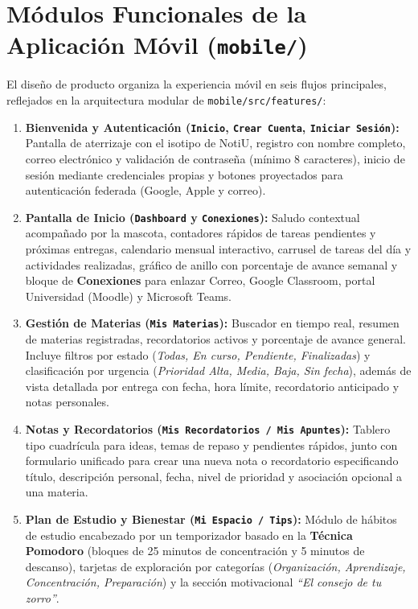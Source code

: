 \documentclass[11pt,letterpaper]{article}
\begin{document}
\section{Módulos Funcionales de la Aplicación Móvil (\texttt{mobile/})}

El diseño de producto organiza la experiencia móvil en seis flujos principales, reflejados en la arquitectura modular de \texttt{mobile/src/features/}:

\begin{enumerate}[leftmargin=1.5em, itemsep=4pt]
  \item \textbf{Bienvenida y Autenticación (\texttt{Inicio}, \texttt{Crear Cuenta}, \texttt{Iniciar Sesión}):}
  Pantalla de aterrizaje con el isotipo de NotiU, registro con nombre completo, correo electrónico y validación de contraseña (mínimo 8 caracteres), inicio de sesión mediante credenciales propias y botones proyectados para autenticación federada (Google, Apple y correo).

  \item \textbf{Pantalla de Inicio (\texttt{Dashboard} y \texttt{Conexiones}):}
  Saludo contextual acompañado por la mascota, contadores rápidos de tareas pendientes y próximas entregas, calendario mensual interactivo, carrusel de tareas del día y actividades realizadas, gráfico de anillo con porcentaje de avance semanal y bloque de \textbf{Conexiones} para enlazar Correo, Google Classroom, portal Universidad (Moodle) y Microsoft Teams.

  \item \textbf{Gestión de Materias (\texttt{Mis Materias}):}
  Buscador en tiempo real, resumen de materias registradas, recordatorios activos y porcentaje de avance general. Incluye filtros por estado (\emph{Todas, En curso, Pendiente, Finalizadas}) y clasificación por urgencia (\emph{Prioridad Alta, Media, Baja, Sin fecha}), además de vista detallada por entrega con fecha, hora límite, recordatorio anticipado y notas personales.

  \item \textbf{Notas y Recordatorios (\texttt{Mis Recordatorios / Mis Apuntes}):}
  Tablero tipo cuadrícula para ideas, temas de repaso y pendientes rápidos, junto con formulario unificado para crear una nueva nota o recordatorio especificando título, descripción personal, fecha, nivel de prioridad y asociación opcional a una materia.

  \item \textbf{Plan de Estudio y Bienestar (\texttt{Mi Espacio / Tips}):}
  Módulo de hábitos de estudio encabezado por un temporizador basado en la \textbf{Técnica Pomodoro} (bloques de 25 minutos de concentración y 5 minutos de descanso), tarjetas de exploración por categorías (\emph{Organización, Aprendizaje, Concentración, Preparación}) y la sección motivacional \emph{``El consejo de tu zorro''}.


\end{enumerate}
\end{document}
